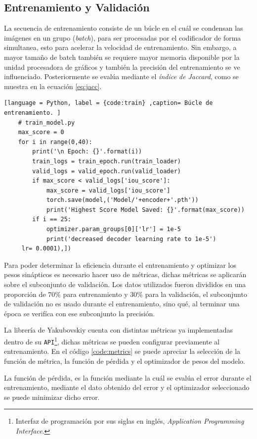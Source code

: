 \subsection{Entrenamiento y Validación}
La secuencia de entrenamiento consiste de un búcle en el cuál se condensan las imágenes en un grupo (\emph{batch}), para ser procesadas por el codificador de forma simultanea, esto para acelerar la velocidad de entrenamiento. Sin embargo, a mayor tamaño de batch también se requiere mayor memoria disponible por la unidad procesadora de gráficos y también la precisión del entrenamiento se ve influenciado. Posteriormente se evalúa mediante el \emph{índice de Jaccard}, como se muestra en la ecuación \ref{eq:jacc}.

\begin{lstlisting}[language = Python, label = {code:train} ,caption= Búcle de entrenamiento. ]
    # train_model.py
    max_score = 0 
    for i in range(0,40):
        print('\n Epoch: {}'.format(i))
        train_logs = train_epoch.run(train_loader)
        valid_logs = valid_epoch.run(valid_loader)
        if max_score < valid_logs['iou_score']:
            max_score = valid_logs['iou_score']
            torch.save(model,('Model/'+encoder+'.pth'))
            print('Highest Score Model Saved: {}'.format(max_score))
        if i == 25:
            optimizer.param_groups[0]['lr'] = 1e-5
            print('decreased decoder learning rate to 1e-5')
     lr= 0.0001),])
\end{lstlisting}

Para poder determinar la eficiencia durante el entrenamiento y optimizar los pesos sinápticos es necesario hacer uso de métricas, dichas métricas se aplicarán sobre el subconjunto de validación. Los datos utilizados fueron divididos en una proporción de $70\%$ para entrenamiento y $30\%$ para la validación, el subconjunto de validación no es usado durante el entrenamiento, sino qué, al terminar una época se verifíca con ese subconjunto la precisión.

La librería de Yakubovskiy \citep{Yakubovskiy:2019} cuenta con distintas métricas ya implementadas dentro de su \texttt{API}\footnote{Interfaz de programación por sus siglas en inglés, \emph{Application Programming Interface}.}, dichas métricas se pueden configurar previamente al entrenamiento. En el código \ref{code:metrics} se puede apreciar la selección de la función de métrica, la función de pérdida y el optimizador de pesos del modelo.

La función de pérdida, es la función mediante la cuál se evalúa el error durante el entrenamiento, mediante el dato obtenido del error y el optimizador seleccionado se puede minimizar dicho error.

